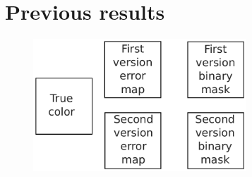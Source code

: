 \documentclass{beamer}
\begin{document}
\section{Previous results}
\begin{frame}
    \begin{figure}
        \includegraphics[width=8cm]{Figures/old_results.pdf}
        \centering
    \end{figure}
\end{frame}


\end{document}
